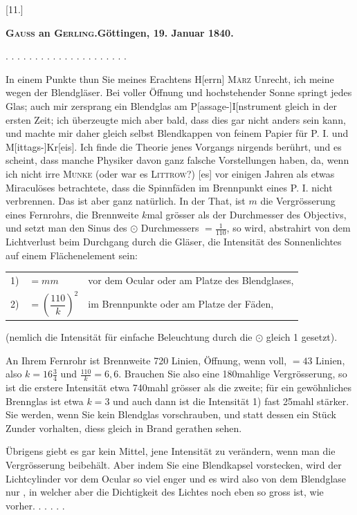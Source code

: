 \clearpage\begingroup
{}
\begin{center}
[11.]\par\medskip
\textbf{\textsc{Gauss} an \textsc{Gerling}.\quad Göttingen, 19. Januar 1840.}
\end{center}
\noindent . . . . . . . . . . . . . . . . . . . . .\par
\noindent\hspace*{\parindent}In einem Punkte thun Sie meines Erachtens H[errn] \textsc{März} Unrecht, ich meine wegen der Blendgläser. Bei voller Öffnung und hochstehender Sonne springt jedes Glas; auch mir zersprang ein Blendglas am P[assage-]I[nstrument gleich in der ersten Zeit; ich überzeugte mich aber bald, dass dies gar nicht anders sein kann, und machte mir daher gleich selbst Blendkappen von feinem Papier für P. I. und M[ittags-]Kr[eis]. Ich finde die Theorie jenes Vorgangs nirgends berührt, und es scheint, dass manche Physiker davon ganz falsche Vorstellungen haben, da, wenn ich nicht irre \textsc{Munke} (oder war es \textsc{Littrow}?) [es] vor einigen Jahren als etwas Miraculöses betrachtete, dass die Spinnfäden im Brennpunkt eines P. I. nicht verbrennen. Das ist aber ganz natürlich. In der That, ist $m$ die Vergrösserung eines Fernrohrs, die Brennweite $k$mal grösser als der Durchmesser des Objectivs, und setzt man den Sinus des $\odot$ Durchmessers $=\frac1{110}$, so wird, abstrahirt von dem Lichtverlust beim Durchgang durch die Gläser, die Intensität des Sonnenlichtes auf einem Flächenelement sein:
\begin{center}
\begin{tabular}{@{}l@{\;}l@{\quad}p{.76\linewidth}@{}}
1)&$=mm$&vor dem Ocular oder am Platze des Blendglases,\\[4pt]
2)&$=\left(\dfrac{110}{k}\right)^2$&im Brennpunkte oder am Platze der Fäden,
\end{tabular}
\end{center}
\noindent (nemlich die Intensität für einfache Beleuchtung durch die $\odot$ gleich 1 gesetzt).

An Ihrem Fernrohr ist Brennweite 720 Linien, Öffnung, wenn voll, $=43$ Linien, also $k=16\frac34$ und $\frac{110}{k}=6{,}6$. Brauchen Sie also eine 180mahlige Vergrösserung, so ist die erstere Intensität etwa 740mahl grösser als die zweite; für ein gewöhnliches Brennglas ist etwa $k=3$ und auch dann ist die Intensität 1) fast 25mahl stärker. Sie werden, wenn Sie kein Blendglas vorschrauben, und statt dessen ein Stück Zunder vorhalten, diess gleich in Brand gerathen sehen.

Übrigens giebt es gar kein Mittel, jene Intensität zu verändern, wenn man die Vergrösserung beibehält. Aber indem Sie eine Blendkapsel vorstecken, wird der Lichtcylinder vor dem Ocular so viel enger und es wird also von dem Blendglase nur , in welcher aber die Dichtigkeit des Lichtes noch eben so gross ist, wie vorher. . . . . .
\clearpage\endgroup

